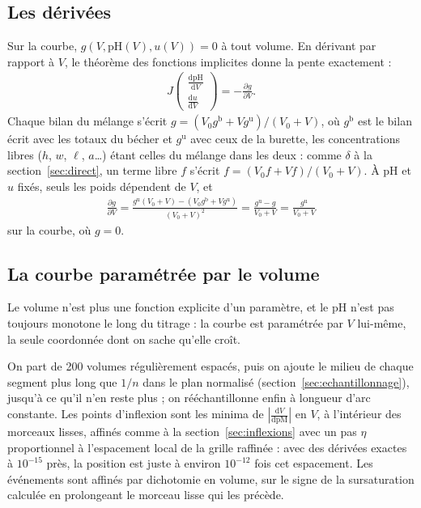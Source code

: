 \documentclass[a4paper,11pt]{article}
\newcommand\pH{\ensuremath{\mathrm{pH}}\xspace}
\newcommand\pM{\ensuremath{\mathrm{pM}}\xspace}
\newcommand\ddp[2]{\frac{\mathrm{d}#1}{\mathrm{d}#2}}
\newcommand\pdp[2]{\frac{\partial#1}{\partial#2}}
\newcommand\pare[1]{\left(#1\right)}
\begin{document}
\subsection{Les dérivées}
Sur la courbe, $g(V,\pH(V),u(V))=0$ à tout volume.
En dérivant par rapport à $V$, le théorème des fonctions implicites donne la pente exactement :
\begin{align}
J\begin{pmatrix}\ddp\pH V\\[2pt]\ddp uV\end{pmatrix}=-\pdp gV.
\end{align}
Chaque bilan du mélange s'écrit $g=\pare{V_0g^\text{b}+Vg^\text{u}}/(V_0+V)$, où $g^\text{b}$ est le bilan écrit avec les totaux du bécher et $g^\text{u}$ avec ceux de la burette, les concentrations libres ($h$, $w$, $\ell$, $a$…) étant celles du mélange dans les deux : comme $\delta$ à la section~\ref{sec:direct}, un terme libre $f$ s'écrit $f=\pare{V_0f+Vf}/(V_0+V)$.
À \pH et $u$ fixés, seuls les poids dépendent de $V$, et
\begin{align}
\pdp gV=\frac{g^\text{u}(V_0+V)-\pare{V_0g^\text{b}+Vg^\text{u}}}{(V_0+V)^2}=\frac{g^\text{u}-g}{V_0+V}=\frac{g^\text{u}}{V_0+V}
\end{align}
sur la courbe, où $g=0$.

\subsection{La courbe paramétrée par le volume}
Le volume n'est plus une fonction explicite d'un paramètre, et le \pH n'est pas toujours monotone le long du titrage : la courbe est paramétrée par $V$ lui-même, la seule coordonnée dont on sache qu'elle croît.
\begin{algo}
On part de 200 volumes régulièrement espacés, puis on ajoute le milieu de chaque segment plus long que $1/n$ dans le plan normalisé (section~\ref{sec:echantillonnage}), jusqu'à ce qu'il n'en reste plus ; on rééchantillonne enfin à longueur d'arc constante.
Les points d'inflexion sont les minima de $\left|\ddp V\pM\right|$ en $V$, à l'intérieur des morceaux lisses, affinés comme à la section~\ref{sec:inflexions} avec un pas $\eta$ proportionnel à l'espacement local de la grille raffinée : avec des dérivées exactes à $10^{-15}$ près, la position est juste à environ $10^{-12}$ fois cet espacement.
Les événements sont affinés par dichotomie en volume, sur le signe de la sursaturation calculée en prolongeant le morceau lisse qui les précède.
\end{algo}
\end{document}
